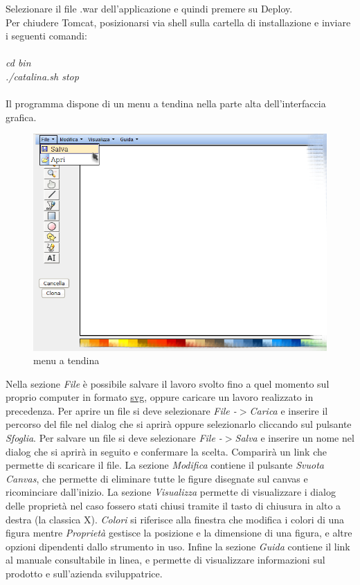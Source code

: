 Selezionare il file .war dell'applicazione e quindi premere su Deploy.\\
Per chiudere Tomcat, posizionarsi via shell sulla cartella di installazione e inviare i seguenti comandi:\\
\\
\textit{cd bin}\\
\textit{./catalina.sh stop}\\
\\

Il programma dispone di un menu a tendina nella parte alta dell'interfaccia grafica.
 
\begin{figure}[!ht]
\centering
\includegraphics[scale=0.4]{images/menu.png}
\caption{menu a tendina}
\end{figure}
 
 
Nella sezione \textit{File} \`e possibile salvare il lavoro svolto fino a quel momento sul proprio computer in formato \underline{svg}, oppure caricare un lavoro realizzato in precedenza.
Per aprire un file si deve selezionare \textit{File -$ > $Carica} e inserire il percorso del file nel dialog che si aprir\`a oppure selezionarlo cliccando sul pulsante \textit{Sfoglia}.
Per salvare un file si deve selezionare \textit{File -$ > $Salva} e inserire un nome nel dialog che si aprir\`a in seguito e confermare la scelta. Comparir\`a un link che permette di scaricare il file.
La sezione \textit{Modifica} contiene il pulsante \textit{Svuota Canvas}, che permette di eliminare tutte le figure disegnate sul canvas e ricominciare dall'inizio.
La sezione \textit{Visualizza} permette di visualizzare i dialog delle propriet\`a nel caso fossero stati chiusi tramite il tasto di chiusura in alto a destra (la classica X). \textit{Colori} si riferisce alla finestra che modifica i colori di una figura mentre \textit{Propriet\`a} gestisce la posizione e la dimensione di una figura, e altre opzioni dipendenti dallo strumento in uso.
Infine la sezione \textit{Guida} contiene il link al manuale consultabile in linea, e permette di visualizzare informazioni sul prodotto e sull'azienda sviluppatrice.
\newpage
 
